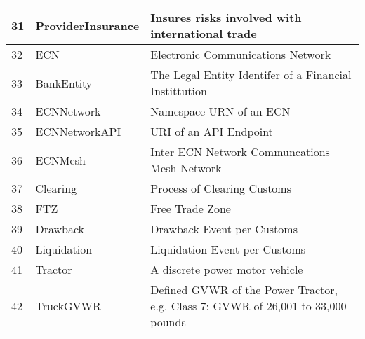\begin{table}
\begin{tabular}{|l|l|l|}
        31 & ProviderInsurance & Insures risks involved with international trade \\ \hline
        32 & ECN & Electronic Communications Network \\ \hline
        33 & BankEntity & The Legal Entity Identifer of a Financial Instittution \\ \hline
        34 & ECNNetwork & Namespace URN of an ECN \\ \hline
        35 & ECNNetworkAPI & URI of an API Endpoint \\ \hline
        36 & ECNMesh & Inter ECN Network Communcations Mesh Network \\ \hline
        37 & Clearing & Process of Clearing Customs \\ \hline
        38 & FTZ & Free Trade Zone \\ \hline
        39 & Drawback & Drawback Event per Customs \\ \hline
        40 & Liquidation & Liquidation Event per Customs \\ \hline
        41 & Tractor & A discrete power motor vehicle \\ \hline
        42 & TruckGVWR & Defined GVWR of the Power Tractor, e.g. Class 7: GVWR of 26,001 to 33,000 pounds \\ \hline
    \end{tabular}
\end{table}